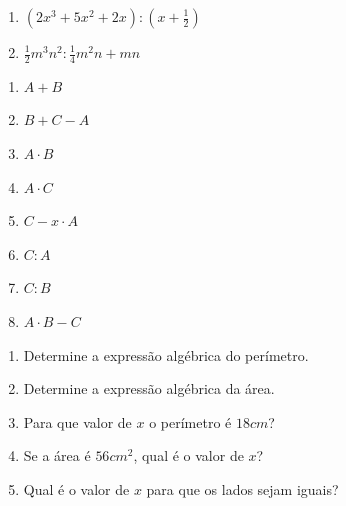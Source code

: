 \begin{exercicios}
\begin{multicols}{2}
\begin{enumerate}[label=\alph*)]
    \item $(2x^3+5x^2+2x) : (x+\frac{1}{2})$
    
    \item $\frac{1}{2}m^3n^2 : \frac{1}{4}m^2n+mn$
\end{enumerate}

\end{multicols}


\begin{multicols}{4}

\begin{enumerate}[label=\alph*)]
    \item $A+B$
    
    \item $B+C-A$
    
    \item $A \cdot B$
    
    \item $A \cdot C$
    
    \item $C - x \cdot A$
    
    \item $C:A$
    
    \item $C:B$
    
    \item $A \cdot B-C$
\end{enumerate}

\end{multicols}


\begin{enumerate}[label=\alph*)]
\item Determine a expressão algébrica do perímetro.

\item Determine a expressão algébrica da área.

\item Para que valor de $x$ o perímetro é $18cm$?

\item Se a área é $56cm^2$, qual é o valor de $x$?

\item Qual é o valor de $x$ para que os lados sejam iguais?
\end{enumerate}


\end{exercicios}
